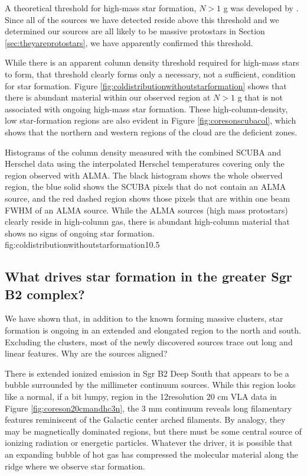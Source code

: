\documentclass[twocolumn]{aastex61}
\begin{document}
A theoretical threshold for high-mass star formation, $N > 1$ g \persc was
developed by \citet{Krumholz2008a}.  Since all of the sources we have detected
reside above this threshold and we determined our sources are all likely to be
massive protostars in Section \ref{sec:theyareprotostars}, we have apparently
confirmed this threshold.


While there is an apparent column density threshold required for high-mass
stars to form, that threshold clearly forms only a necessary, not a sufficient,
condition for star formation.  Figure
\ref{fig:coldistributionwithoutstarformation} shows that there is abundant
material within our observed region at $N>1$ g \persc that is not associated
with ongoing high-mass star formation.  These high-column-density, low
star-formation regions are also evident in Figure \ref{fig:coresonscubacol},
which shows that the northern and western regions of the cloud are the
deficient zones.

{Histograms of the column density measured with the combined SCUBA and Herschel
data using the interpolated Herschel temperatures covering only the region
observed with ALMA.  The black histogram shows the whole observed region,
the blue solid shows the SCUBA pixels that do not contain an ALMA source,
and the red dashed region shows those pixels that are within one beam
FWHM of an ALMA source.  While the ALMA sources (high mass protostars)
clearly reside in high-column gas, there is abundant high-column material
that shows no signs of ongoing star formation.}
{fig:coldistributionwithoutstarformation}{1}{0.5\textwidth}

\subsection{What drives star formation in the greater Sgr B2 complex?}
\label{sec:whatdrives}
We have shown that, in addition to the known forming massive clusters,
star formation is ongoing in an extended and elongated region to the north
and south.  Excluding the clusters, most of the newly discovered sources
trace out long and linear features.  Why are the sources aligned?

There is extended ionized emission in Sgr B2 Deep South that appears to be a
bubble surrounded by the millimeter continuum sources.  While this region looks
like a normal, if a bit lumpy, \hii region in the 12\arcsec resolution 20 cm
VLA data in Figure \ref{fig:coreson20cmandhc3n}, the 3 mm continuum reveals long
filamentary features reminiscent of the Galactic center arched filaments.  By
analogy, they may be magnetically dominated regions, but there must be some
central source of ionizing radiation or energetic particles.  Whatever the
driver, it is possible that an expanding bubble of hot gas has compressed
the molecular material along the ridge where we observe star formation.
\end{document}
